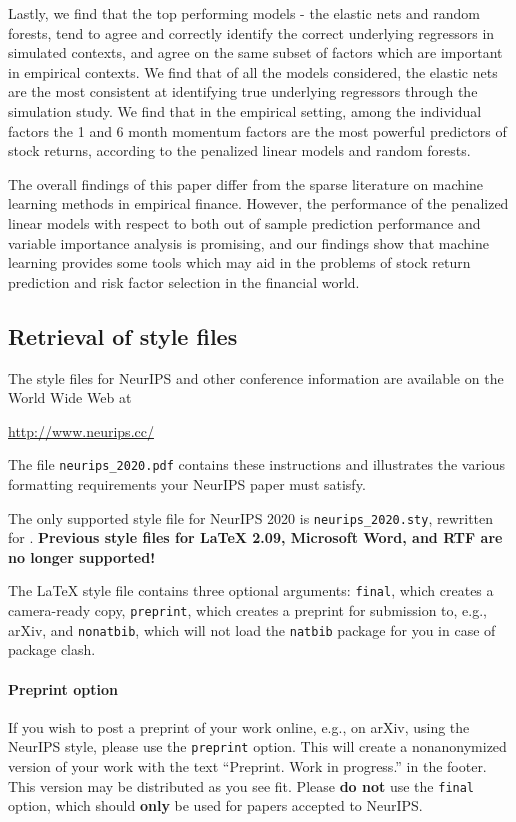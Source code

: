 \documentclass{article}
\begin{document}
Lastly, we find that the top performing models - the elastic nets and random forests, tend to agree and correctly identify the correct underlying regressors in simulated contexts, and agree on the same subset of factors which are important in empirical contexts. We find that of all the models considered, the elastic nets are the most consistent at identifying true underlying regressors through the simulation study. We find that in the empirical setting, among the individual factors the 1 and 6 month momentum factors are the most powerful predictors of stock returns, according to the penalized linear models and random forests. 

The overall findings of this paper differ from the sparse literature on machine learning methods in empirical finance. However, the performance of the penalized linear models with respect to both out of sample prediction performance and variable importance analysis is promising, and our findings show that machine learning provides some tools which may aid in the problems of stock return prediction and risk factor selection in the financial world. 

\newpage

\subsection{Retrieval of style files}

The style files for NeurIPS and other conference information are available on
the World Wide Web at
\begin{center}
  \url{http://www.neurips.cc/}
\end{center}
The file \verb+neurips_2020.pdf+ contains these instructions and illustrates the
various formatting requirements your NeurIPS paper must satisfy.

The only supported style file for NeurIPS 2020 is \verb+neurips_2020.sty+,
rewritten for \LaTeXe{}.  \textbf{Previous style files for \LaTeX{} 2.09,
  Microsoft Word, and RTF are no longer supported!}

The \LaTeX{} style file contains three optional arguments: \verb+final+, which
creates a camera-ready copy, \verb+preprint+, which creates a preprint for
submission to, e.g., arXiv, and \verb+nonatbib+, which will not load the
\verb+natbib+ package for you in case of package clash.

\paragraph{Preprint option}
If you wish to post a preprint of your work online, e.g., on arXiv, using the
NeurIPS style, please use the \verb+preprint+ option. This will create a
nonanonymized version of your work with the text ``Preprint. Work in progress.''
in the footer. This version may be distributed as you see fit. Please \textbf{do
  not} use the \verb+final+ option, which should \textbf{only} be used for
papers accepted to NeurIPS.
\end{document}
